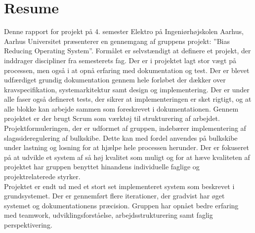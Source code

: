 \chapter{Resume}
Denne rapport for projekt på 4. semester Elektro på Ingeniørhøjskolen Aarhus, Aarhus Universitet præsenterer en gennemgang af gruppens projekt: ”Bias Reducing Operating System”. Formålet er selvstændigt at definere et projekt, der inddrager discipliner fra semesterets fag. 
Der er i projektet lagt stor vægt på processen, men også i at opnå erfaring med dokumentation og test. Der er blevet udfærdiget grundig dokumentation gennem hele forløbet der dækker over kravspecifikation, systemarkitektur samt design og implementering. Der er under alle faser også defineret tests, der sikrer at implementeringen er sket rigtigt, og at alle blokke kan arbejde sammen som foreskrevet i dokumentationen. Gennem projektet er der brugt Scrum som værktøj til strukturering af arbejdet.\\

Projektformuleringen, der er udformet af gruppen, indebærer implementering af slagssideregulering af bulkskibe. Dette kan med fordel anvendes på bulkskibe under lastning og losning for at hjælpe hele processen herunder. Der er fokuseret på at udvikle et system af så høj kvalitet som muligt og for at hæve kvaliteten af projektet har gruppen benyttet hinandens individuelle faglige og projektrelaterede styrker.\\

Projektet er endt ud med et stort set implementeret system som beskrevet i grundsystemet. Der er gennemført flere iterationer, der gradvist har øget systemet og dokumentationens præcision. Gruppen har opnået bedre erfaring med teamwork, udviklingsforståelse, arbejdsstrukturering samt faglig perspektivering.

